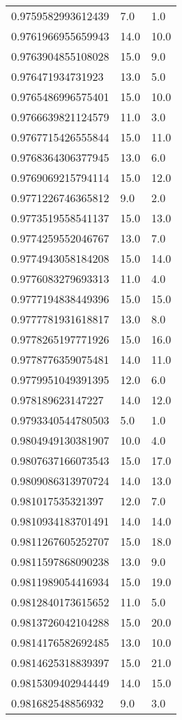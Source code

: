 \begin{center}
\begin{supertabular}[H]{p{0.30\textwidth}p{0.05\textwidth}p{0.05\textwidth}}
0.9759582993612439 & 7.0 & 1.0 \\ 
0.9761966955659943 & 14.0 & 10.0 \\ 
0.9763904855108028 & 15.0 & 9.0 \\ 
0.976471934731923 & 13.0 & 5.0 \\ 
0.9765486996575401 & 15.0 & 10.0 \\ 
0.9766639821124579 & 11.0 & 3.0 \\ 
0.9767715426555844 & 15.0 & 11.0 \\ 
0.9768364306377945 & 13.0 & 6.0 \\ 
0.9769069215794114 & 15.0 & 12.0 \\ 
0.9771226746365812 & 9.0 & 2.0 \\ 
0.9773519558541137 & 15.0 & 13.0 \\ 
0.9774259552046767 & 13.0 & 7.0 \\ 
0.9774943058184208 & 15.0 & 14.0 \\ 
0.9776083279693313 & 11.0 & 4.0 \\ 
0.9777194838449396 & 15.0 & 15.0 \\ 
0.9777781931618817 & 13.0 & 8.0 \\ 
0.9778265197771926 & 15.0 & 16.0 \\ 
0.9778776359075481 & 14.0 & 11.0 \\ 
0.9779951049391395 & 12.0 & 6.0 \\ 
0.978189623147227 & 14.0 & 12.0 \\ 
0.9793340544780503 & 5.0 & 1.0 \\ 
0.9804949130381907 & 10.0 & 4.0 \\ 
0.9807637166073543 & 15.0 & 17.0 \\ 
0.9809086313970724 & 14.0 & 13.0 \\ 
0.981017535321397 & 12.0 & 7.0 \\ 
0.9810934183701491 & 14.0 & 14.0 \\ 
0.9811267605252707 & 15.0 & 18.0 \\ 
0.9811597868090238 & 13.0 & 9.0 \\ 
0.9811989054416934 & 15.0 & 19.0 \\ 
0.9812840173615652 & 11.0 & 5.0 \\ 
0.9813726042104288 & 15.0 & 20.0 \\ 
0.9814176582692485 & 13.0 & 10.0 \\ 
0.9814625318839397 & 15.0 & 21.0 \\ 
0.9815309402944449 & 14.0 & 15.0 \\ 
0.981682548856932 & 9.0 & 3.0 \\ 

\end{supertabular}
\end{center}
